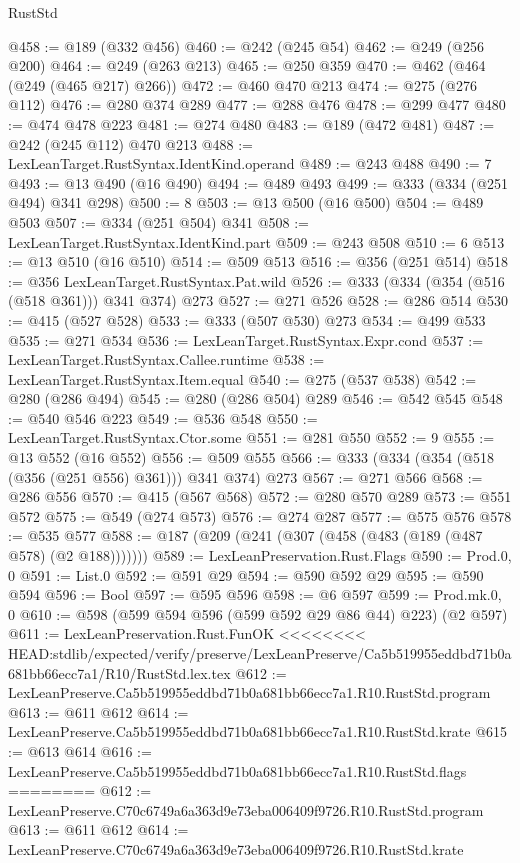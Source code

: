\begin{lexlean}{RustStd}
\begin{coremodule}
{\begin{coremodule}
{{{{{{{{@458 := @189 (@332 @456)
@460 := @242 (@245 @54)
@462 := @249 (@256 @200)
@464 := @249 (@263 @213)
@465 := @250 @359
@470 := @462 (@464 (@249 (@465 @217) @266))
@472 := @460 @470 @213
@474 := @275 (@276 @112)
@476 := @280 @374 @289
@477 := @288 @476
@478 := @299 @477
@480 := @474 @478 @223
@481 := @274 @480
@483 := @189 (@472 @481)
@487 := @242 (@245 @112) @470 @213
@488 := LexLeanTarget.RustSyntax.IdentKind.operand
@489 := @243 @488
@490 := 7
@493 := @13 @490 (@16 @490)
@494 := @489 @493
@499 := @333 (@334 (@251 @494) @341 @298)
@500 := 8
@503 := @13 @500 (@16 @500)
@504 := @489 @503
@507 := @334 (@251 @504) @341
@508 := LexLeanTarget.RustSyntax.IdentKind.part
@509 := @243 @508
@510 := 6
@513 := @13 @510 (@16 @510)
@514 := @509 @513
@516 := @356 (@251 @514)
@518 := @356 LexLeanTarget.RustSyntax.Pat.wild
@526 := @333 (@334 (@354 (@516 (@518 @361))) @341 @374) @273
@527 := @271 @526
@528 := @286 @514
@530 := @415 (@527 @528)
@533 := @333 (@507 @530) @273
@534 := @499 @533
@535 := @271 @534
@536 := LexLeanTarget.RustSyntax.Expr.cond
@537 := LexLeanTarget.RustSyntax.Callee.runtime
@538 := LexLeanTarget.RustSyntax.Item.equal
@540 := @275 (@537 @538)
@542 := @280 (@286 @494)
@545 := @280 (@286 @504) @289
@546 := @542 @545
@548 := @540 @546 @223
@549 := @536 @548
@550 := LexLeanTarget.RustSyntax.Ctor.some
@551 := @281 @550
@552 := 9
@555 := @13 @552 (@16 @552)
@556 := @509 @555
@566 := @333 (@334 (@354 (@518 (@356 (@251 @556) @361))) @341 @374) @273
@567 := @271 @566
@568 := @286 @556
@570 := @415 (@567 @568)
@572 := @280 @570 @289
@573 := @551 @572
@575 := @549 (@274 @573)
@576 := @274 @287
@577 := @575 @576
@578 := @535 @577
@588 := @187 (@209 (@241 (@307 (@458 (@483 (@189 (@487 @578) (@2 @188)))))))
@589 := LexLeanPreservation.Rust.Flags
@590 := Prod.{0, 0}
@591 := List.{0}
@592 := @591 @29
@594 := @590 @592 @29
@595 := @590 @594
@596 := Bool
@597 := @595 @596
@598 := @6 @597
@599 := Prod.mk.{0, 0}
@610 := @598 (@599 @594 @596 (@599 @592 @29 @86 @44) @223) (@2 @597)
@611 := LexLeanPreservation.Rust.FunOK
<<<<<<<< HEAD:stdlib/expected/verify/preserve/LexLeanPreserve/Ca5b519955eddbd71b0a681bb66ecc7a1/R10/RustStd.lex.tex
@612 := LexLeanPreserve.Ca5b519955eddbd71b0a681bb66ecc7a1.R10.RustStd.program
@613 := @611 @612
@614 := LexLeanPreserve.Ca5b519955eddbd71b0a681bb66ecc7a1.R10.RustStd.krate
@615 := @613 @614
@616 := LexLeanPreserve.Ca5b519955eddbd71b0a681bb66ecc7a1.R10.RustStd.flags
========
@612 := LexLeanPreserve.C70c6749a6a363d9e73eba006409f9726.R10.RustStd.program
@613 := @611 @612
@614 := LexLeanPreserve.C70c6749a6a363d9e73eba006409f9726.R10.RustStd.krate
}}}}}}}}
\end{coremodule}}
\end{coremodule}
\end{lexlean}
